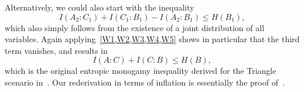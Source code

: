 Alternatively, we could also start with the inequality~\cite{fritz2013marginal}
\[
	I(A_2 : C_1) + I(C_1 : B_1) - I(A_2 : B_1) \leq H(B_1),	
\]
which also simply follows from the existence of a joint distribution of all variables. Again applying~\cref{W1,W2,W3,W4,W5} shows in particular that the third term vanishes, and results in
\[
	I(A : C) + I(C : B) \leq H(B) ,
\]
which is the original entropic monogamy inequality derived for the Triangle scenario in~\cite{fritz2012bell}. Our rederivation in terms of inflation is essentially the proof of~\citet{pusey2014gdag}.



\bigskip

